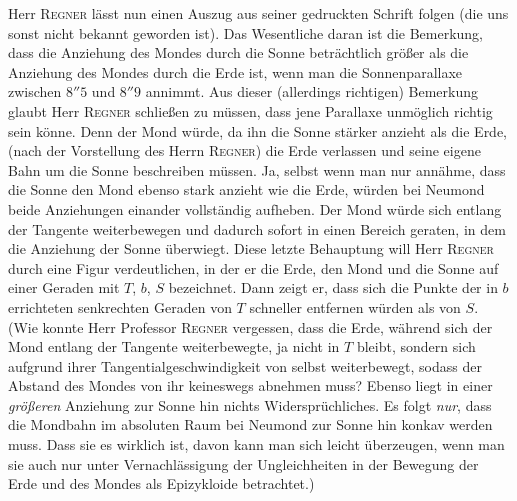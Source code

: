 Herr \textsc{Regner} lässt nun einen Auszug aus seiner gedruckten Schrift folgen (die uns sonst nicht bekannt geworden ist). Das Wesentliche daran ist die Bemerkung, dass die Anziehung des Mondes durch die Sonne beträchtlich größer als die Anziehung des Mondes durch die Erde ist, wenn man die Sonnenparallaxe zwischen $8''5$ und $8''9$ annimmt. Aus dieser (allerdings richtigen) Bemerkung glaubt Herr \textsc{Regner} schließen zu müssen, dass jene Parallaxe unmöglich richtig sein könne. Denn der Mond würde, da ihn die Sonne stärker anzieht als die Erde, (nach der Vorstellung des Herrn \textsc{Regner}) die Erde verlassen und seine eigene Bahn um die Sonne beschreiben müssen. Ja, selbst wenn man nur annähme, dass die Sonne den Mond ebenso stark anzieht wie die Erde, würden bei Neumond beide Anziehungen einander vollständig aufheben. Der Mond würde sich entlang der Tangente weiterbewegen und dadurch sofort in einen Bereich geraten, in dem die Anziehung der Sonne überwiegt. Diese letzte Behauptung will Herr \textsc{Regner} durch eine Figur verdeutlichen, in der er die Erde, den Mond und die Sonne auf einer Geraden mit $T$, $b$, $S$ bezeichnet. Dann zeigt er, dass sich die Punkte der in $b$ errichteten senkrechten Geraden von $T$ schneller entfernen würden als von $S$. (Wie konnte Herr Professor \textsc{Regner} vergessen, dass die Erde, während sich der Mond entlang der Tangente weiterbewegte, ja nicht in $T$ bleibt, sondern sich aufgrund ihrer Tangentialgeschwindigkeit von selbst weiterbewegt, sodass der Abstand des Mondes von ihr keineswegs abnehmen muss? Ebenso liegt in einer \emph{größeren} Anziehung zur Sonne hin nichts Widersprüchliches. Es folgt \emph{nur}, dass die Mondbahn im absoluten Raum bei Neumond zur Sonne hin konkav werden muss. Dass sie es wirklich ist, davon kann man sich leicht überzeugen, wenn man sie auch nur unter Vernachlässigung der Ungleichheiten in der Bewegung der Erde und des Mondes als Epizykloide betrachtet.)

